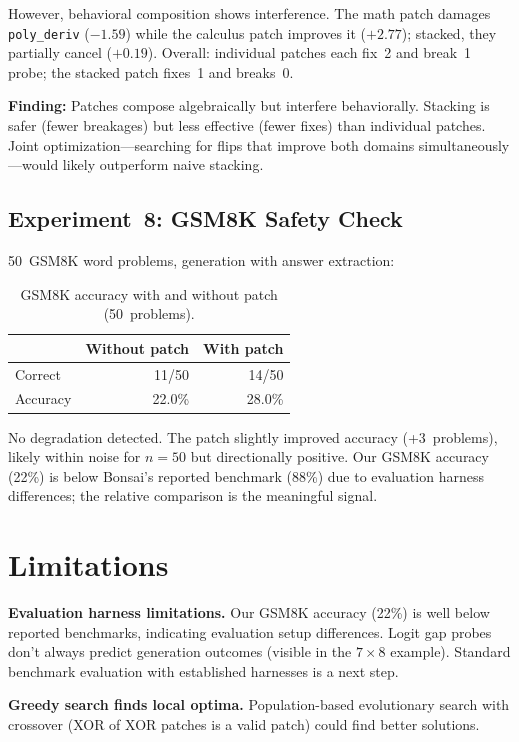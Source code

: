 \documentclass[11pt,a4paper]{article}
\begin{document}
However, behavioral composition shows interference. The math patch
damages \texttt{poly\_deriv} ($-1.59$) while the calculus patch improves
it ($+2.77$); stacked, they partially cancel ($+0.19$). Overall:
individual patches each fix~2 and break~1 probe; the stacked patch
fixes~1 and breaks~0.

\textbf{Finding:} Patches compose algebraically but interfere
behaviorally. Stacking is safer (fewer breakages) but less effective
(fewer fixes) than individual patches. Joint optimization---searching
for flips that improve both domains simultaneously---would likely
outperform naive stacking.

\subsection{Experiment~8: GSM8K Safety Check}

50~GSM8K word problems, generation with answer extraction:

\begin{table}[h]
\centering
\caption{GSM8K accuracy with and without patch (50~problems).}
\begin{tabular}{@{}lrr@{}}
\toprule
& Without patch & With patch \\
\midrule
Correct & 11/50 & 14/50 \\
Accuracy & 22.0\% & 28.0\% \\
\bottomrule
\end{tabular}
\end{table}

No degradation detected. The patch slightly improved accuracy (+3~problems),
likely within noise for $n=50$ but directionally positive. Our GSM8K accuracy (22\%) is below Bonsai's reported benchmark (88\%)
due to evaluation harness differences; the relative comparison is the
meaningful signal.

\section{Limitations}
\label{sec:limitations}

\textbf{Evaluation harness limitations.} Our GSM8K accuracy (22\%) is
well below reported benchmarks, indicating evaluation setup differences.
Logit gap probes don't always predict generation outcomes (visible in
the $7\times8$ example). Standard benchmark evaluation with established
harnesses is a next step.

\textbf{Greedy search finds local optima.} Population-based evolutionary
search with crossover (XOR of XOR patches is a valid patch) could find
better solutions.
\end{document}
